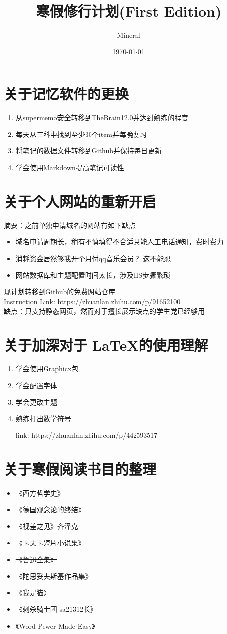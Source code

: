 \documentclass[utf8]{ctexart}
\author{Mineral}
\title{寒假修行计划(First Edition)}
\date {\today}
\begin{document}
		\maketitle
		\Large	
		\section{关于记忆软件的更换}
		\begin{enumerate}
				\item 从supermemo安全转移到TheBrain12.0并达到熟练的程度
				\item 每天从三科中找到至少30个item并每晚复习
				\item 将笔记的数据文件转移到Github并保持每日更新
				\item 学会使用Markdown提高笔记可读性			
		\end{enumerate}
		\section{关于个人网站的重新开启}
		摘要：之前单独申请域名的网站有如下缺点
		\begin{itemize}
				\item 域名申请周期长，稍有不慎填得不合适只能人工电话通知，费时费力
				\item 消耗资金居然够我开个月付qq音乐会员？ 这不能忍
				\item 网站数据库和主题配置时间太长，涉及IIS步骤繁琐	
		\end{itemize}
		现计划转移到Github的免费网站仓库\\
		Instruction Link: https://zhuanlan.zhihu.com/p/91652100 \\
		缺点：只支持静态网页，然而对于擅长展示缺点的学生党已经够用
		\section{关于加深对于 \LaTeX 的使用理解}
		\begin{enumerate}
				\item 学会使用Graphicx包
				\item 学会配置字体
				\item 学会更改主题
				\item 熟练打出数学符号
				\par link: https://zhuanlan.zhihu.com/p/442593517			
		\end{enumerate}
		\section{关于寒假阅读书目的整理}
		\begin{itemize}
				\item 《西方哲学史》
				\item 《德国观念论的终结》
				\item 《视差之见》齐泽克 
				\item 《卡夫卡短片小说集》
				\item \sout{《鲁迅全集》}
				\item 《陀思妥夫斯基作品集》
				\item 《我是猫》
				\item 《刺杀骑士团 sa21312长》
				\item 《Word Power Made Easy》
		\end{itemize}
\end{document}
